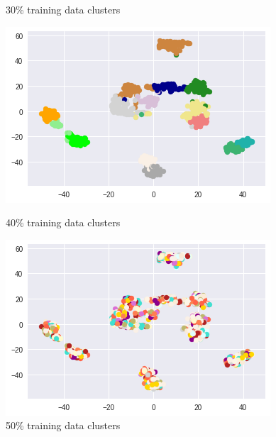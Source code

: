 \documentclass{article}
\begin{document}
\begin{figure}[!htb]
	\caption{30\% training data clusters}\label{fig:part_1_task_5_cluster_30}
	\endminipage\hfill
	\includegraphics[width=\linewidth]{../output_plots/FMNIST/clustering/cluster-distribution-40.png}
	\caption{40\% training data clusters}\label{fig:part_1_task_5_cluster_40}
	\endminipage
	\includegraphics[width=\linewidth]{../output_plots/FMNIST/clustering/cluster-distribution-50.png}
	\caption{50\% training data clusters}\label{fig:part_1_task_5_cluster_50}
	\endminipage
\end{figure}
\end{document}
